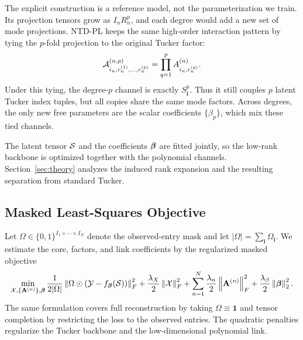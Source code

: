 The explicit construction is a reference model, not the parameterization we
train. Its projection tensors grow as \(I_nR_n^p\), and each degree would add a
new set of mode projections. NTD-PL keeps the same high-order interaction
pattern by tying the \(p\)-fold projection to the original Tucker factor:
\[
  \mathcal{A}^{(n,p)}_{i_n,r_n^{(1)},\ldots,r_n^{(p)}}
  =
  \prod_{q=1}^{p} A^{(n)}_{i_n,r_n^{(q)}} .
\]
Under this tying, the degree-\(p\) channel is exactly \(S_{\mathbf i}^{p}\).
Thus it still couples \(p\) latent Tucker index tuples, but all copies share
the same mode factors. Across degrees, the only new free parameters are the
scalar coefficients \(\{\beta_p\}\), which mix these tied channels.

The latent tensor \(\mathcal{S}\) and the coefficients \(\boldsymbol{\beta}\) are fitted jointly,
so the low-rank backbone is optimized together with the polynomial channels.
Section~\ref{sec:theory} analyzes the induced rank expansion and the resulting
separation from standard Tucker.

\subsection{Masked Least-Squares Objective}
\label{sec:masked-objective}

Let \(\Omega\in\{0,1\}^{I_1\times\cdots\times I_N}\) denote the observed-entry
mask and let \(|\Omega|=\sum_{\mathbf i}\Omega_{\mathbf i}\). We estimate the
core, factors, and link coefficients by the regularized masked objective
\begin{equation}
  \min_{\mathcal{X},\{\mathbf{A}^{(n)}\},\boldsymbol{\beta}}
  \frac{1}{2|\Omega|}
  \left\lVert 
    \Omega \odot
    \left(\mathcal{Y} - f_{\boldsymbol{\beta}}(\mathcal{S})\right)
   \right\rVert_F^2
  +
  \frac{\lambda_X}{2}\left\lVert \mathcal{X} \right\rVert_F^2
  +
  \sum_{n=1}^{N}\frac{\lambda_n}{2}\left\lVert \mathbf{A}^{(n)} \right\rVert_F^2
  +
  \frac{\lambda_\beta}{2}\left\lVert \boldsymbol{\beta} \right\rVert_2^2.
\end{equation}
The same formulation covers full reconstruction by taking
\(\Omega\equiv\mathbf 1\) and tensor completion by restricting the loss to the
observed entries. The quadratic penalties regularize the Tucker backbone and
the low-dimensional polynomial link.
